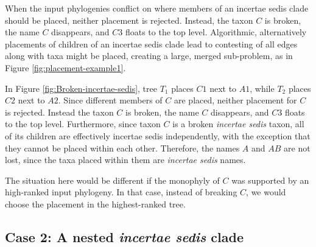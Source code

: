 \documentclass[english]{article}
\begin{document}
When the input phylogenies conflict on where members of an incertae
sedis clade should be placed, neither placement is rejected.
Instead,
the taxon $C$ is broken, the name $C$ disappears, and $C3$ floats to
the top level.
Algorithmic, alternatively placements of children of an
incertae sedis clade lead to contesting of all edges along with taxa
might be placed, creating a large, merged sub-problem, as in Figure
\ref{fig:placement-example1}.

In Figure \ref{fig:Broken-incertae-sedis}, tree $T_{1}$ places $C1$
next to $A1$, while $T_{2}$ places $C2$ next to $A2$.
Since different
members of $C$ are placed, neither placement for $C$ is rejected.
Instead the taxon $C$ is broken, the name $C$ disappears, and $C3$
floats to the top level.
Furthermore, since taxon $C$ is a broken
\emph{incertae sedis }taxon, all of its children are effectively
incertae sedis independently, with the exception that they cannot be
placed within each other.
Therefore, the names $A$ and $AB$ are not
lost, since the taxa placed within them are \emph{incertae sedis}
names.

The situation here would be different if the monophyly of $C$ was
supported by an high-ranked input phylogeny.
In that case, instead of
breaking $C$, we would choose the placement in the highest-ranked
tree.

\subsection{Case 2: A nested \emph{incertae sedis} clade}
\end{document}
